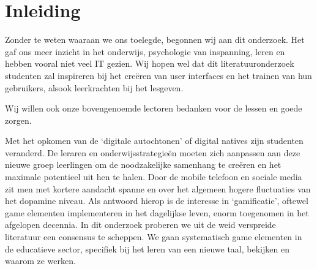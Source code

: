 \documentclass{hogent-article}
\affiliation{
  \textsuperscript{1} \href{mailto:ArneVerbanck@student.hogent.be}{ArneVerbanck@student.hogent.be}}
\affiliation{
  \textsuperscript{2} \href{mailto:GustavoVanEenooghe@student.hogent.be}{GustavoVanEenooghe@student.hogent.be}
}
\begin{document}
\flushbottom %
\maketitle %
\tableofcontents %
\thispagestyle{empty} %


\section{Inleiding}


Zonder te weten waaraan we ons toelegde, begonnen wij aan dit onderzoek. Het gaf ons meer inzicht in het onderwijs, psychologie van inspanning, leren en hebben vooral niet veel IT gezien. Wij hopen wel dat dit literatuuronderzoek studenten zal inspireren bij het creëren van user interfaces en het trainen van hun gebruikers, alsook leerkrachten bij het lesgeven. 

Wij willen ook onze bovengenoemde lectoren bedanken voor de lessen en goede zorgen.  

Met het opkomen van de ‘digitale autochtonen’ of digital natives zijn studenten veranderd. De leraren en onderwijsstrategieën moeten zich aanpassen aan deze nieuwe groep leerlingen om de noodzakelijke samenhang te creëren en het maximale potentieel uit hen te halen. Door de mobile telefoon en sociale media zit men met kortere aandacht spanne en over het algemeen hogere fluctuaties van het dopamine niveau. Als antwoord hierop is de interesse in ‘gamificatie’, oftewel game elementen implementeren in het dagelijkse leven, enorm toegenomen in het afgelopen decennia. In dit onderzoek proberen we uit de weid verspreide literatuur een consensus te scheppen. We gaan systematisch game elementen in de educatieve sector, specifiek bij het leren van een nieuwe taal, bekijken en waarom ze werken.

\end{document}
